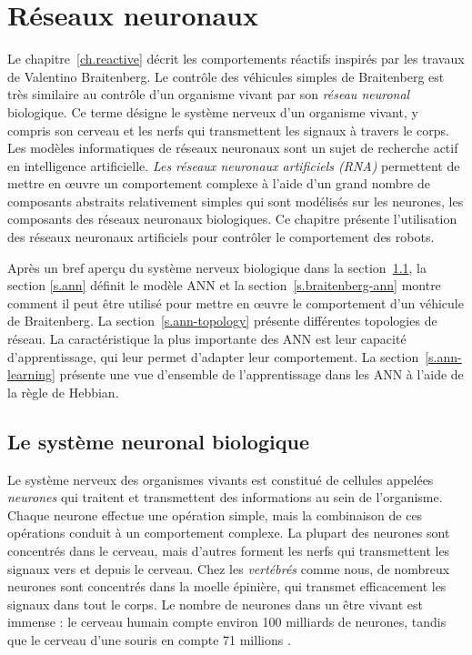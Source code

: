 
\chapter{Réseaux neuronaux}\label{ch.neural}

Le chapitre~\ref{ch.reactive} décrit les comportements réactifs inspirés par les travaux de Valentino Braitenberg. Le contrôle des véhicules simples de Braitenberg est très similaire au contrôle d'un organisme vivant par son \emph{réseau neuronal} biologique. Ce terme désigne le système nerveux d'un organisme vivant, y compris son cerveau et les nerfs qui transmettent les signaux à travers le corps. Les modèles informatiques de réseaux neuronaux sont un sujet de recherche actif en intelligence artificielle. \emph{Les réseaux neuronaux artificiels (RNA)} permettent de mettre en œuvre un comportement complexe à l'aide d'un grand nombre de composants abstraits relativement simples qui sont modélisés sur les neurones, les composants des réseaux neuronaux biologiques. Ce chapitre présente l'utilisation des réseaux neuronaux artificiels pour contrôler le comportement des robots.

Après un bref aperçu du système nerveux biologique dans la section~\ref{s.bio-nn}, la section \ref{s.ann} définit le modèle ANN et la section~\ref{s.braitenberg-ann} montre comment il peut être utilisé pour mettre en œuvre le comportement d'un véhicule de Braitenberg. La section~\ref{s.ann-topology} présente différentes topologies de réseau. La caractéristique la plus importante des ANN est leur capacité d'apprentissage, qui leur permet d'adapter leur comportement. La section~\ref{s.ann-learning} présente une vue d'ensemble de l'apprentissage dans les ANN à l'aide de la règle de Hebbian.

\section{Le système neuronal biologique}\label{s.bio-nn}

Le système nerveux des organismes vivants est constitué de cellules appelées \emph{neurones} qui traitent et transmettent des informations au sein de l'organisme. Chaque neurone effectue une opération simple, mais la combinaison de ces opérations conduit à un comportement complexe. La plupart des neurones sont concentrés dans le cerveau, mais d'autres forment les nerfs qui transmettent les signaux vers et depuis le cerveau. Chez les \emph{vertébrés} comme nous, de nombreux neurones sont concentrés dans la moelle épinière, qui transmet efficacement les signaux dans tout le corps. Le nombre de neurones dans un être vivant est immense : le cerveau humain compte environ 100 milliards de neurones, tandis que le cerveau d'une souris en compte 71 millions \cite{herculano2009human}. 

